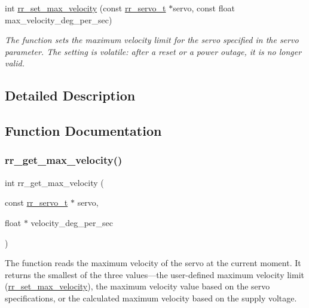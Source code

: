\begin{DoxyCompactItemize}
int \hyperlink{group___config_ga18d5d9dc728f7cb8e7674b9e9b275aca}{rr\+\_\+set\+\_\+max\+\_\+velocity} (const \hyperlink{structrr__servo__t}{rr\+\_\+servo\+\_\+t} $\ast$servo, const float max\+\_\+velocity\+\_\+deg\+\_\+per\+\_\+sec)
\begin{DoxyCompactList}\small\item\em The function sets the maximum velocity limit for the servo specified in the \textquotesingle{}servo\textquotesingle{} parameter. The setting is volatile\+: after a reset or a power outage, it is no longer valid. \end{DoxyCompactList}\end{DoxyCompactItemize}


\subsection{Detailed Description}


\subsection{Function Documentation}
\mbox{\label{group___config_gad388cd353b262b614b563b093d61c911}} 
\subsubsection{\texorpdfstring{rr\+\_\+get\+\_\+max\+\_\+velocity()}{rr\_get\_max\_velocity()}}
{\footnotesize\ttfamily int rr\+\_\+get\+\_\+max\+\_\+velocity (\begin{DoxyParamCaption}\item[{const \hyperlink{structrr__servo__t}{rr\+\_\+servo\+\_\+t} $\ast$}]{servo,  }\item[{float $\ast$}]{velocity\+\_\+deg\+\_\+per\+\_\+sec }\end{DoxyParamCaption})}



The function reads the maximum velocity of the servo at the current moment. It returns the smallest of the three values—the user-\/defined maximum velocity limit (\hyperlink{group___config_ga18d5d9dc728f7cb8e7674b9e9b275aca}{rr\+\_\+set\+\_\+max\+\_\+velocity}), the maximum velocity value based on the servo specifications, or the calculated maximum velocity based on the supply voltage. 


